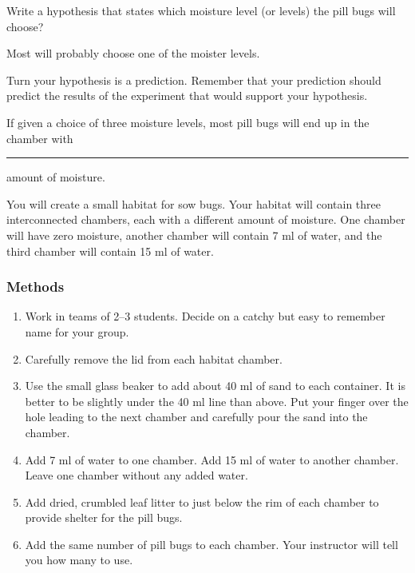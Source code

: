 \documentclass[12pt, hidelinks]{exam}
\newcommand*\AnswerBox[2]{%
    \parbox[t][#1]{0.92\textwidth}{%
    \begin{solution}#2\end{solution}}
    \vspace{\stretch{1}}
}
\newlength{\basespace}
\begin{document}
\begin{questions}

\question \label{ques:hypothesis}
Write a hypothesis that states which moisture level (or levels) the pill bugs will choose?

\AnswerBox{0.35\basespace}{Most will probably choose one of the moister levels.}


\question
Turn your hypothesis is a prediction. Remember that your prediction should predict the results of the experiment that would support your hypothesis. 

\AnswerBox{0.35\basespace}{%
	If given a choice of three moisture levels, most pill bugs will end up in the chamber with \rule{0.75in}{0.4pt} amount of moisture.
}

You will create a small habitat for sow bugs.  Your habitat will contain three interconnected chambers, each with a different amount of moisture.  One chamber will have zero moisture, another chamber will contain 7 ml of water, and the third chamber will contain 15 ml of water.


\subsubsection*{Methods}

\begin{enumerate}
	
	\item Work in teams of 2–3 students. Decide on a catchy but easy to remember name for your group.
	
	\item Carefully remove the lid from each habitat chamber. 
	
	\item Use the small glass beaker to add about 40 ml of sand to each container. It is better to be slightly under the 40 ml line than above. Put your finger over the hole leading to the next chamber and carefully pour the sand into the chamber.
	
	\item Add 7 ml of water to one chamber. Add 15 ml of water to another chamber. Leave one chamber without any added water.
	
	\item Add dried, crumbled leaf litter to just below the rim of each chamber to provide shelter for the pill bugs.
	
	\item Add the same number of pill bugs to each chamber. Your instructor will tell you how many to use.
	

\end{enumerate}
\end{questions}
\end{document}
